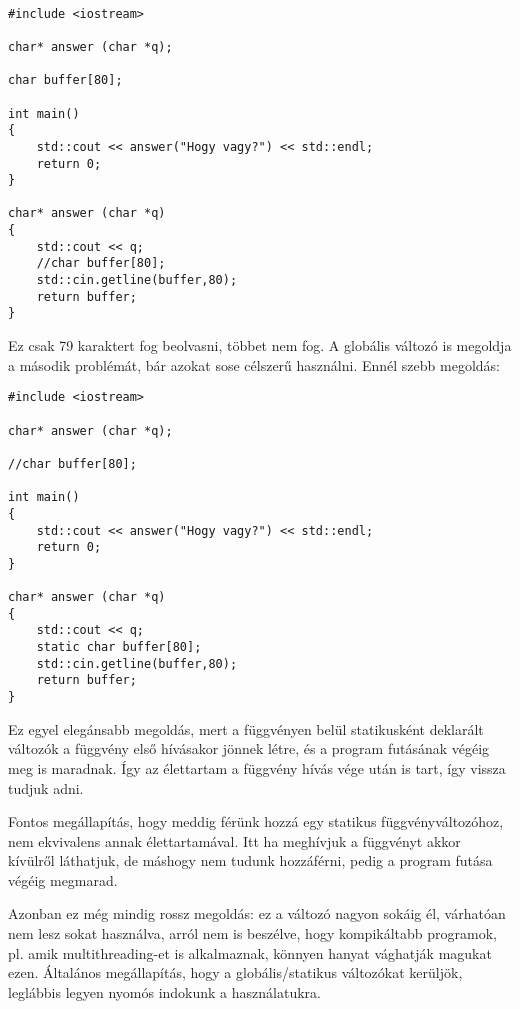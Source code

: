 \documentclass[a4paper,11.5pt]{article}
\begin{document}
	\begin{example}\ 
		\begin{lstlisting}
#include <iostream>

char* answer (char *q);

char buffer[80];

int main()
{
	std::cout << answer("Hogy vagy?") << std::endl;
	return 0;
}

char* answer (char *q)
{
	std::cout << q;
	//char buffer[80];
	std::cin.getline(buffer,80);
	return buffer;
}
		\end{lstlisting}
		Ez csak 79 karaktert fog beolvasni, többet nem fog. A globális változó is megoldja a második problémát, bár azokat sose célszerű használni. Ennél szebb megoldás:
		\begin{lstlisting}
#include <iostream>

char* answer (char *q);

//char buffer[80];

int main()
{
	std::cout << answer("Hogy vagy?") << std::endl;
	return 0;
}

char* answer (char *q)
{
	std::cout << q;
	static char buffer[80];
	std::cin.getline(buffer,80);
	return buffer;
}
		\end{lstlisting}
		
		Ez egyel elegánsabb megoldás, mert a függvényen belül statikusként deklarált változók a függvény első hívásakor jönnek létre, és a program futásának végéig meg is maradnak. Így az élettartam a függvény hívás vége után is tart, így vissza tudjuk adni.
	\end{example}
	Fontos megállapítás, hogy meddig férünk hozzá egy statikus függvényváltozóhoz, nem ekvivalens annak élettartamával. Itt ha meghívjuk a függvényt akkor kívülről láthatjuk, de máshogy nem tudunk hozzáférni, pedig a program futása végéig megmarad.
	
	Azonban ez még mindig rossz megoldás: ez a változó nagyon sokáig él, várhatóan nem lesz sokat használva, arról nem is beszélve, hogy kompikáltabb programok, pl. amik multithreading-et is alkalmaznak, könnyen hanyat vághatják magukat ezen. Általános megállapítás, hogy a globális/statikus változókat kerüljök, leglábbis legyen nyomós indokunk a használatukra.
	
\end{document}
